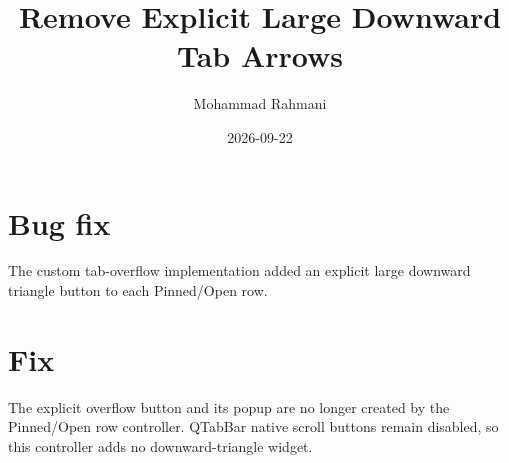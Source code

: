 \documentclass[a4paper]{article}
\title{Remove Explicit Large Downward Tab Arrows}
\date{2026-09-22}
\author{Mohammad Rahmani}
\begin{document}
   \maketitle

   \begin{preview}
      \section{Bug fix}
      The custom tab-overflow implementation added an explicit large downward
      triangle button to each Pinned/Open row.

      \section{Fix}
      The explicit overflow button and its popup are no longer created by the
      Pinned/Open row controller. QTabBar native scroll buttons remain disabled,
      so this controller adds no downward-triangle widget.
   \end{preview}

   
   
\end{document}
